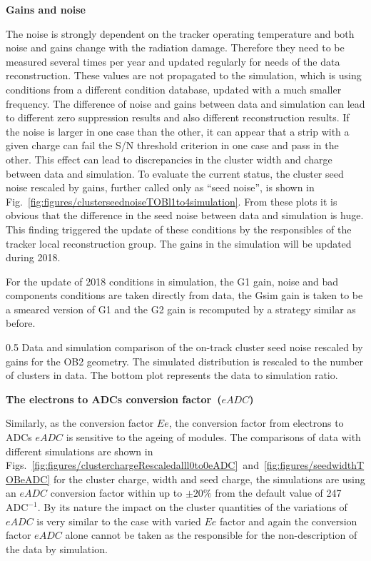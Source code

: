 \textbf{Gains and noise}

The noise is strongly dependent on the tracker operating temperature and both noise and gains change with the radiation damage. Therefore they need to be measured several times per year and updated regularly for needs of the data reconstruction. These values are not propagated to the simulation, which is using conditions from a different condition database, updated with a much smaller frequency. The difference of noise and gains between data and simulation can lead to different zero suppression results and also different reconstruction results. If the noise is larger in one case than the other, it can appear that a strip with a given charge can fail the S/N threshold criterion in one case and pass in the other. This effect can lead to discrepancies in the cluster width and charge between data and simulation. To evaluate the current status, the cluster seed noise rescaled by gains, further called only as ``seed noise'', is shown in Fig.~\ref{fig:figures/clusterseednoiseTOBl1to4simulation}. From these plots it is obvious that the difference in the seed noise between data and simulation is huge. This finding triggered the update of these conditions by the responsibles of the tracker local reconstruction group. The gains in the simulation will be updated during 2018.

For the update of 2018 conditions in simulation, the G1 gain, noise and bad components conditions are taken directly from data, the Gsim gain is taken to be a smeared version of G1 and the G2 gain is recomputed by a strategy similar as before.

                 {0.5}       %
                 { Data and simulation comparison of the on-track cluster seed noise rescaled by gains for the OB2 geometry. The simulated distribution is rescaled to the number of clusters in data. The bottom plot represents the data to simulation ratio. }


\textbf{The electrons to ADCs conversion factor~($eADC$)}

Similarly, as the conversion factor $Ee$, the conversion factor from electrons to ADCs $eADC$ is sensitive to the ageing of modules. The comparisons of data with different simulations are shown in Figs.~\ref{fig:figures/clusterchargeRescaledalll0to0eADC}~and~\ref{fig:figures/seedwidthTOBeADC} for the cluster charge, width and seed charge, the simulations are using an $eADC$ conversion factor within up to $\pm 20\%$ from the default value of 247~$\mathrm{ADC^{-1}}$. By its nature the impact on the cluster quantities of the variations of $eADC$ is very similar to the case with varied $Ee$ factor and again the conversion factor $eADC$ alone cannot be taken as the responsible for the non-description of the data by simulation. 


